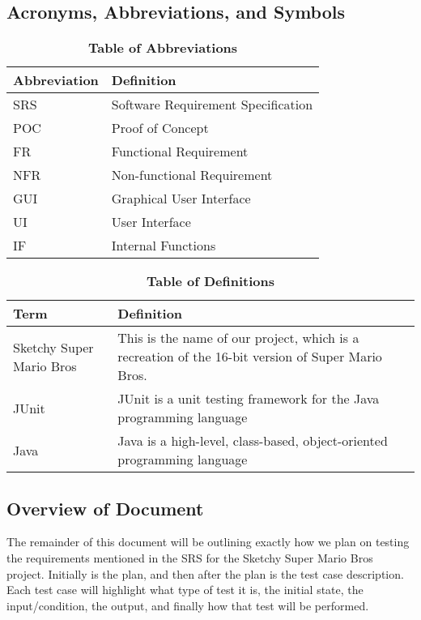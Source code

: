 \documentclass[12pt, titlepage]{article}
\begin{document}
\subsection{Acronyms, Abbreviations, and Symbols}

\begin{table}[H]
\caption{\textbf{Table of Abbreviations}} \label{Table}

\begin{tabularx}{\textwidth}{p{3cm}X}
\toprule
\textbf{Abbreviation} & \textbf{Definition} \\
\midrule
SRS & Software Requirement Specification\\
POC & Proof of Concept\\
FR & Functional Requirement\\
NFR & Non-functional Requirement\\
GUI & Graphical User Interface\\
UI & User Interface\\
IF & Internal Functions\\
\bottomrule
\end{tabularx}

\end{table}

\begin{table}[H]
\caption{\textbf{Table of Definitions}} \label{Table}

\begin{tabularx}{\textwidth}{p{3cm}X}
\toprule
\textbf{Term} & \textbf{Definition}\\
\midrule
Sketchy Super Mario Bros & This is the name of our project, which is a recreation of the 16-bit version of Super Mario Bros.\\
JUnit & JUnit is a unit testing framework for the Java programming language\\
Java & Java is a high-level, class-based, object-oriented programming language\\
\bottomrule
\end{tabularx}

\end{table}

\subsection{Overview of Document}

The remainder of this document will be outlining exactly how we plan on testing the requirements mentioned in the SRS for the Sketchy Super Mario Bros project. Initially is the plan, and then after the plan is the test case description. Each test case will highlight what type of test it is, the initial state, the input/condition, the output, and finally how that test will be performed.
\end{document}
